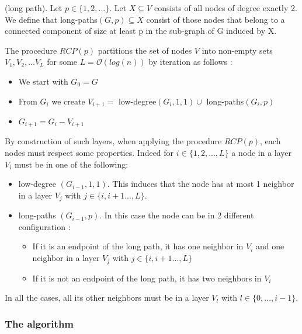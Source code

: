 \begin{defi} (long path).
Let $p \in \{1,2,...\}$. Let $X \subseteq V$ consists of all nodes of degree exactly 2. We define that long-paths$(G, p)\subseteq X$ consist of those nodes that belong to a connected component of size at least p in the sub-graph of G induced by X.
\end{defi}

The procedure $RCP(p)$ partitions the set of nodes $V$ into non-empty sets $V_1,V_2,...V_L$ for some $L = \mathcal{O}(log(n))$ by iteration as follows \cite[p.23]{1}:
\begin{itemize}
    \item We start with $G_0 = G$
    \item From $G_i$ we create $V_{i+1} = $ low-degree$(G_i,1,1)\cup $ long-paths$(G_i,p)$
    \item $G_{i+1} = G_i- V_{i+1}$
\end{itemize}

By construction of such layers, when applying the procedure $RCP(p)$, each nodes must respect some properties. Indeed for $i \in \{1,2,...,L\}$ a node in a layer $V_i$ must be in one of the following:
\begin{itemize}
    \item low-degree $(G_{i-1},1,1)$.
    This induces that the node has at most 1 neighbor in a layer $V_j$ with $j \in \{i,i+1...,L\}$.
    
    \item long-paths $(G_{i-1},p)$.
    In this case the node can be in 2 different configuration :
    \begin{itemize}
        \item If it is an endpoint of the long path, it has one neighbor in $V_i$ and one neighbor in a layer $V_j$ with $j \in \{i,i+1...,L\}$ 
        \item If it is not an endpoint of the long path, it has two neighbors in $V_i$
    \end{itemize}
\end{itemize}
In all the cases, all its other neighbors must be in a layer $V_l$ with $l \in \{0,...,i-1\}$.

\subsubsection{The algorithm}

